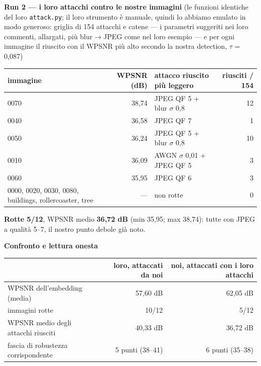 \documentclass[10pt,a4paper]{article}
\begin{document}
\medskip
\textbf{Run 2 — i loro attacchi contro le nostre immagini} (le funzioni identiche del loro \texttt{attack.py}; il loro strumento è manuale, quindi lo abbiamo emulato in modo generoso: griglia di 154 attacchi e catene — i parametri suggeriti nei loro commenti, allargati, più blur$\to$JPEG come nel loro esempio — e per ogni immagine il riuscito con il WPSNR più alto secondo la nostra detection, $\tau$ = 0,087)

\begin{tabularx}{\linewidth}{@{}l r X r@{}}
\toprule
immagine & WPSNR (dB) & attacco riuscito più leggero & riusciti / 154 \\
\midrule
0070 & 38,74 & JPEG QF 5 + blur $\sigma$ 0,8 & 12 \\
0040 & 36,58 & JPEG QF 7 & 1 \\
0050 & 36,24 & JPEG QF 5 + blur $\sigma$ 0,8 & 10 \\
0010 & 36,09 & AWGN $\sigma$ 0,01 + JPEG QF 5 & 3 \\
0060 & 35,95 & JPEG QF 6 & 3 \\
0000, 0020, 0030, 0080, buildings, rollercoaster, tree & — & \textcolor{ok}{non rotte} & 0 \\
\bottomrule
\end{tabularx}

\textcolor{ko}{\textbf{Rotte 5/12}}, WPSNR medio \textbf{36,72 dB} (min 35,95; max 38,74): tutte con JPEG a qualità 5–7, il nostro punto debole già noto.

\medskip
\textbf{Confronto e lettura onesta}

\begin{tabularx}{\linewidth}{@{}X r r@{}}
\toprule
 & loro, attaccati da noi & noi, attaccati con i loro attacchi \\
\midrule
WPSNR dell'embedding (media) & 57,60 dB & 62,05 dB \\
immagini rotte & 10/12 & 5/12 \\
WPSNR medio degli attacchi riusciti & 40,33 dB & 36,72 dB \\
fascia di robustezza corrispondente & 5 punti (38–41) & 6 punti (35–38) \\
\bottomrule
\end{tabularx}
\end{document}
